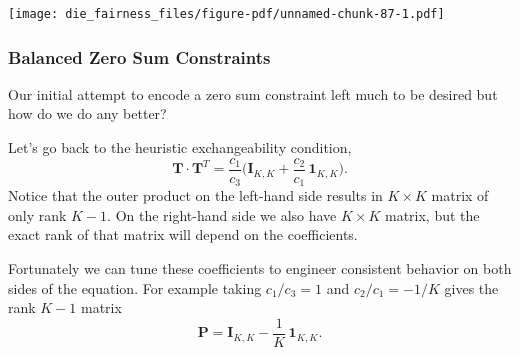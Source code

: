 \documentclass[
  letterpaper,
  DIV=11,
  numbers=noendperiod]{scrartcl}
\begin{document}
\texttt{[image: die\_fairness\_files/figure-pdf/unnamed-chunk-87-1.pdf]}

\subsubsection{Balanced Zero Sum
Constraints}\label{balanced-zero-sum-constraints}

Our initial attempt to encode a zero sum constraint left much to be
desired but how do we do any better?

Let's go back to the heuristic exchangeability condition, \[
\mathbf{T} \cdot \mathbf{T}^{T}
=
\frac{c_{1}}{c_{3}} \bigg( \mathbf{I}_{K, K}
+ \frac{c_{2}}{c_{1}} \, \mathbf{1}_{K, K} \bigg).
\] Notice that the outer product on the left-hand side results in
\(K \times K\) matrix of only rank \(K - 1\). On the right-hand side we
also have \(K \times K\) matrix, but the exact rank of that matrix will
depend on the coefficients.

Fortunately we can tune these coefficients to engineer consistent
behavior on both sides of the equation. For example taking
\(c_{1} / c_{3} = 1\) and \(c_{2} / c_{1} = - 1 / K\) gives the rank
\(K - 1\) matrix \[
\mathbf{P}
=
\mathbf{I}_{K, K} - \frac{1}{K} \, \mathbf{1}_{K, K}.
\]
\end{document}
